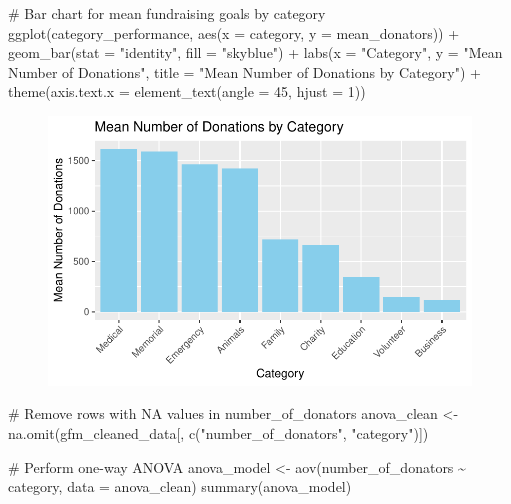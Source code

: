 \documentclass[
  letterpaper,
  DIV=11,
  numbers=noendperiod]{scrartcl}
\newenvironment{Shaded}{\begin{snugshade}}{\end{snugshade}}
\newcommand{\AttributeTok}[1]{\textcolor[rgb]{0.40,0.45,0.13}{#1}}
\newcommand{\CommentTok}[1]{\textcolor[rgb]{0.37,0.37,0.37}{#1}}
\newcommand{\DecValTok}[1]{\textcolor[rgb]{0.68,0.00,0.00}{#1}}
\newcommand{\FunctionTok}[1]{\textcolor[rgb]{0.28,0.35,0.67}{#1}}
\newcommand{\NormalTok}[1]{\textcolor[rgb]{0.00,0.23,0.31}{#1}}
\newcommand{\OtherTok}[1]{\textcolor[rgb]{0.00,0.23,0.31}{#1}}
\newcommand{\SpecialCharTok}[1]{\textcolor[rgb]{0.37,0.37,0.37}{#1}}
\newcommand{\StringTok}[1]{\textcolor[rgb]{0.13,0.47,0.30}{#1}}
\begin{document}
\begin{Shaded}
\begin{Highlighting}[]
\CommentTok{\# Bar chart for mean fundraising goals by category}
\FunctionTok{ggplot}\NormalTok{(category\_performance, }\FunctionTok{aes}\NormalTok{(}\AttributeTok{x =}\NormalTok{ category, }\AttributeTok{y =}\NormalTok{ mean\_donators)) }\SpecialCharTok{+}
  \FunctionTok{geom\_bar}\NormalTok{(}\AttributeTok{stat =} \StringTok{"identity"}\NormalTok{, }\AttributeTok{fill =} \StringTok{"skyblue"}\NormalTok{) }\SpecialCharTok{+}
  \FunctionTok{labs}\NormalTok{(}\AttributeTok{x =} \StringTok{"Category"}\NormalTok{, }\AttributeTok{y =} \StringTok{"Mean Number of Donations"}\NormalTok{, }
       \AttributeTok{title =} \StringTok{"Mean Number of Donations by Category"}\NormalTok{) }\SpecialCharTok{+}
  \FunctionTok{theme}\NormalTok{(}\AttributeTok{axis.text.x =} \FunctionTok{element\_text}\NormalTok{(}\AttributeTok{angle =} \DecValTok{45}\NormalTok{, }\AttributeTok{hjust =} \DecValTok{1}\NormalTok{))}
\end{Highlighting}
\end{Shaded}

\begin{figure}[H]

{\centering \includegraphics{gfm_data_analysis_files/figure-pdf/unnamed-chunk-24-1.pdf}

}

\end{figure}

\begin{Shaded}
\begin{Highlighting}[]
\CommentTok{\# Remove rows with NA values in \textquotesingle{}number\_of\_donators\textquotesingle{}}
\NormalTok{anova\_clean }\OtherTok{\textless{}{-}} \FunctionTok{na.omit}\NormalTok{(gfm\_cleaned\_data[, }\FunctionTok{c}\NormalTok{(}\StringTok{"number\_of\_donators"}\NormalTok{, }\StringTok{"category"}\NormalTok{)])}

\CommentTok{\# Perform one{-}way ANOVA}
\NormalTok{anova\_model }\OtherTok{\textless{}{-}} \FunctionTok{aov}\NormalTok{(number\_of\_donators }\SpecialCharTok{\textasciitilde{}}\NormalTok{ category, }\AttributeTok{data =}\NormalTok{ anova\_clean)}
\FunctionTok{summary}\NormalTok{(anova\_model)}
\end{Highlighting}
\end{Shaded}
\end{document}
